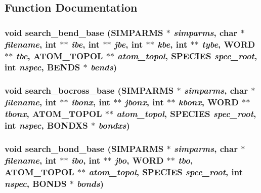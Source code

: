 \subsection{Function Documentation}
\subsubsection{\setlength{\rightskip}{0pt plus 5cm}void search\_\-bend\_\-base ({\bf SIMPARMS} $\ast$ {\em simparms}, char $\ast$ {\em filename}, int $\ast$$\ast$ {\em ibe}, int $\ast$$\ast$ {\em jbe}, int $\ast$$\ast$ {\em kbe}, int $\ast$$\ast$ {\em tybe}, {\bf WORD} $\ast$$\ast$ {\em tbe}, {\bf ATOM\_\-TOPOL} $\ast$$\ast$ {\em atom\_\-topol}, {\bf SPECIES} {\em spec\_\-root}, int {\em nspec}, {\bf BENDS} $\ast$ {\em bends})}\label{input_2md__searchbase_8c_0993b9062bb9cc9cda2d5508da286a15}


\subsubsection{\setlength{\rightskip}{0pt plus 5cm}void search\_\-bocross\_\-base ({\bf SIMPARMS} $\ast$ {\em simparms}, char $\ast$ {\em filename}, int $\ast$$\ast$ {\em ibonx}, int $\ast$$\ast$ {\em jbonx}, int $\ast$$\ast$ {\em kbonx}, {\bf WORD} $\ast$$\ast$ {\em tbonx}, {\bf ATOM\_\-TOPOL} $\ast$$\ast$ {\em atom\_\-topol}, {\bf SPECIES} {\em spec\_\-root}, int {\em nspec}, {\bf BONDXS} $\ast$ {\em bondxs})}\label{input_2md__searchbase_8c_48b262c0bc016fecc91430ca593fbb42}


\subsubsection{\setlength{\rightskip}{0pt plus 5cm}void search\_\-bond\_\-base ({\bf SIMPARMS} $\ast$ {\em simparms}, char $\ast$ {\em filename}, int $\ast$$\ast$ {\em ibo}, int $\ast$$\ast$ {\em jbo}, {\bf WORD} $\ast$$\ast$ {\em tbo}, {\bf ATOM\_\-TOPOL} $\ast$$\ast$ {\em atom\_\-topol}, {\bf SPECIES} {\em spec\_\-root}, int {\em nspec}, {\bf BONDS} $\ast$ {\em bonds})}\label{input_2md__searchbase_8c_ddcd5e951cfd3710326823bd326946a5}


